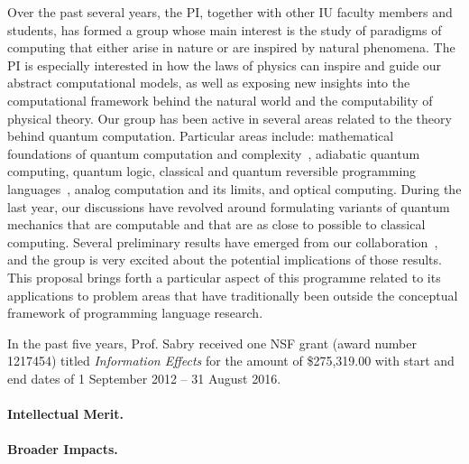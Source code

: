 \documentclass{article}
\theoremstyle{remark}
\begin{document}
Over the past several years, the PI, together with other IU faculty
members and students, has formed a group whose main interest is the
study of paradigms of computing that either arise in nature or are
inspired by natural phenomena. The PI is especially interested in how
the laws of physics can inspire and guide our abstract computational
models, as well as exposing new insights into the computational
framework behind the natural world and the computability of physical
theory. Our group has been active in several areas related to the
theory behind quantum computation. Particular areas include:
mathematical foundations of quantum computation and
complexity~\cite{AGVS2007,VAS2006},
adiabatic quantum computing, quantum logic, classical and quantum
reversible programming languages~\cite{Sabry:2003:MQC:871895.871900},
analog computation and its limits, and optical computing. During the
last year, our discussions have revolved around formulating variants
of quantum mechanics that are computable and that are as close to
possible to classical computing. Several preliminary results have
emerged from our collaboration~\cite{usat,finiteQC,geometry2013,DQT2014}, and the group
is very excited about the potential implications of those
results. This proposal brings forth a particular aspect of this
programme related to its applications to problem areas that have
traditionally been outside the conceptual framework of programming
language research.

In the past five years, Prof. Sabry received one NSF grant (award
number 1217454) titled \emph{Information Effects} for the amount of
\$275,319.00 with start and end dates of 1 September 2012 -- 31 August
2016.




\paragraph*{Intellectual Merit.}                                                 
                                                                     
\paragraph*{Broader Impacts.}                                                    
                                                                                
\newpage
\printbibliography
\end{document}
